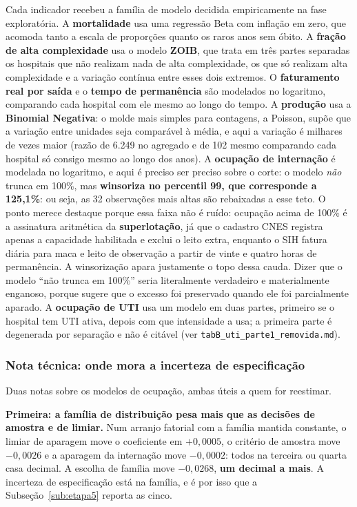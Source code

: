 Cada indicador recebeu a família de modelo decidida empiricamente na
fase exploratória. A \textbf{mortalidade} usa uma regressão Beta com
inflação em zero, que acomoda tanto a escala de proporções quanto os
raros anos sem óbito. A \textbf{fração de alta complexidade} usa o
modelo \textbf{ZOIB}, que trata em três partes separadas os hospitais
que não realizam nada de alta complexidade, os que só realizam alta
complexidade e a variação contínua entre esses dois extremos. O
\textbf{faturamento real por saída} e o \textbf{tempo de permanência}
são modelados no logaritmo, comparando cada hospital com ele mesmo ao
longo do tempo. A \textbf{produção} usa a \textbf{Binomial Negativa}: o
molde mais simples para contagens, a Poisson, supõe que a variação entre
unidades seja comparável à média, e aqui a variação é milhares de vezes
maior (razão de 6.249 no agregado e de 102 mesmo comparando cada
hospital só consigo mesmo ao longo dos anos). A \textbf{ocupação de
internação} é modelada no logaritmo, e aqui é preciso ser preciso sobre
o corte: o modelo \emph{não} trunca em 100\%, mas \textbf{winsoriza no
percentil 99, que corresponde a 125,1\%}: ou seja, as 32 observações
mais altas são rebaixadas a esse teto. O ponto merece destaque porque
essa faixa não é ruído: ocupação acima de 100\% é a assinatura
aritmética da \textbf{superlotação}, já que o cadastro CNES registra
apenas a capacidade habilitada e exclui o leito extra, enquanto o SIH
fatura diária para maca e leito de observação a partir de vinte e quatro
horas de permanência. A winsorização apara justamente o topo dessa
cauda. Dizer que o modelo ``não trunca em 100\%'' seria literalmente
verdadeiro e materialmente enganoso, porque sugere que o excesso foi
preservado quando ele foi parcialmente aparado. A
\textbf{ocupação de UTI} usa um modelo em duas partes, primeiro se o
hospital tem UTI ativa, depois com que intensidade a usa; a primeira
parte é degenerada por separação e não é citável (ver
\texttt{tabB\_uti\_parte1\_removida.md}).

\subsubsection*{Nota técnica: onde mora a incerteza de especificação}

Duas notas sobre os modelos de ocupação, ambas úteis a quem for reestimar.

\textbf{Primeira: a família de distribuição pesa mais que as decisões de
amostra e de limiar.} Num arranjo fatorial com a família mantida constante,
o limiar de aparagem move o coeficiente em $+0{,}0005$, o critério de
amostra move $-0{,}0026$ e a aparagem da internação move $-0{,}0002$: todos
na terceira ou quarta casa decimal. A escolha de família move $-0{,}0268$,
\textbf{um decimal a mais}. A incerteza de especificação está na família,
e é por isso que a Subseção~\ref{sub:etapa5} reporta as cinco.

